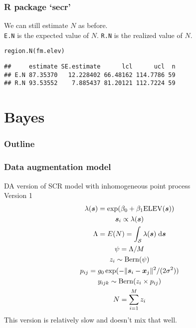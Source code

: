\documentclass[color=usenames,dvipsnames]{beamer}\usepackage[]{graphicx}\usepackage[]{xcolor}
\makeatletter
\newcommand{\hldef}[1]{\textcolor[rgb]{0,0,0}{#1}}%
\newcommand{\hlkwd}[1]{\textcolor[rgb]{0.004,0.004,0.506}{#1}}%
\newenvironment{kframe}{%
 \def\at@end@of@kframe{}%
 \ifinner\ifhmode%
  \def\at@end@of@kframe{\end{minipage}}%
  \begin{minipage}{\columnwidth}%
 \fi\fi%
 \def\FrameCommand##1{\hskip\@totalleftmargin \hskip-\fboxsep
 \colorbox{shadecolor}{##1}\hskip-\fboxsep
     \hskip-\linewidth \hskip-\@totalleftmargin \hskip\columnwidth}%
 \MakeFramed {\advance\hsize-\width
   \@totalleftmargin\z@ \linewidth\hsize
   \@setminipage}}%
 {\par\unskip\endMakeFramed%
 \at@end@of@kframe}
\newenvironment{knitrout}{}{} %
\newcommand{\inr}[1]{\colorbox{inlinecolor}{\texttt{#1}}}
\makeatother
\begin{document}
\begin{frame}[fragile]
  \frametitle{R package `secr'}
  We can still estimate $N$ as before. \\
  \vfill
  \inr{E.N} is the expected value of
  $N$. \inr{R.N} is the realized value of $N$. 
  \vfill
\begin{knitrout}\small
{}\color{fgcolor}\begin{kframe}
\begin{alltt}
\hlkwd{region.N}\hldef{(fm.elev)}
\end{alltt}
\begin{verbatim}
##     estimate SE.estimate      lcl      ucl  n
## E.N 87.35370   12.228402 66.48162 114.7786 59
## R.N 93.53552    7.885437 81.20121 112.7224 59
\end{verbatim}
\end{kframe}
\end{knitrout}
\end{frame}




\section{Bayes}




\begin{frame}
  \frametitle{Outline}
  \Large
  \tableofcontents[currentsection]
\end{frame}





\begin{frame}
  \frametitle{Data augmentation model}
  DA version of SCR model with inhomogeneous point process \\
  \centering
  Version 1 \\
  \begin{gather*}
    \lambda({\bm s}) = \exp(\beta_0 + \beta_1 \mathrm{ELEV}({\bm s})) \\
    {\bm s}_i \propto \lambda({\bm s}) \\
    \Lambda = E(N) = \int_{\mathcal{S}} \lambda({\bm s})\; \mathrm{d}{\bm s} \\
    \psi = \Lambda/M \\
    z_i \sim \mathrm{Bern}(\psi) \\
    p_{ij} = g_0\exp(-\|{\bm s}_i-{\bm x}_j\|^2/(2\sigma^2)) \\
    y_{ijk} \sim \mathrm{Bern}(z_i\times p_{ij}) \\
    N=\sum_{i=1}^M z_i
  \end{gather*}
  \pause \vfill
  This version is relatively slow and doesn't mix that well. \\
\end{frame}
\end{document}
